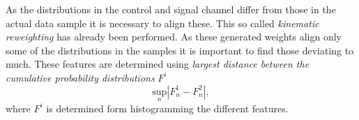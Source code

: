 As the distributions in the control and signal channel differ from those in the actual data sample it is necessary to align these. This so called \textit{kinematic reweighting} has already been performed. As these generated weights align only some of the distributions in the samples it is important to find those deviating to much. These features are determined using \textit{largest distance between the cumulative probability distributions} $F^i$
\begin{equation*}
	\underset{n}{\mathrm{sup}}\left|F^1_n - F^2_n\right|,
\end{equation*}
where $F^i$ is determined form histogramming the different features.